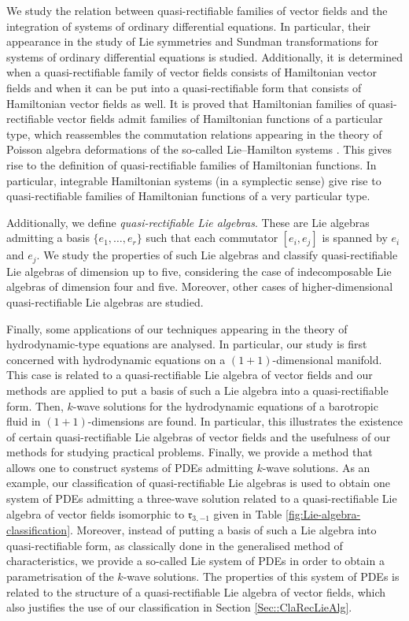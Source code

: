 \documentclass[12pt]{article}
\theoremstyle{plain}
\theoremstyle{definition}
\numberwithin{equation}{section}
\begin{document}
We study the relation between quasi-rectifiable families of vector fields and the integration of systems of ordinary differential equations. In particular, their appearance in the study of Lie symmetries and Sundman transformations for systems of ordinary differential equations  is studied. Additionally, it is determined when a quasi-rectifiable family of vector fields consists of Hamiltonian vector fields and when it can be put into a quasi-rectifiable form that consists of Hamiltonian vector fields as well. It is proved that Hamiltonian families of quasi-rectifiable vector fields admit families of Hamiltonian functions of a particular type, which reassembles the commutation relations appearing in the theory of Poisson algebra deformations of the so-called Lie--Hamilton systems \cite{BCFHL17}. This gives rise to the definition of quasi-rectifiable families of Hamiltonian functions.  In particular, integrable Hamiltonian systems (in a symplectic sense) give rise to quasi-rectifiable families of Hamiltonian functions of a very particular type.

Additionally, we define {\it quasi-rectifiable Lie algebras}. These are Lie algebras admitting a basis $\{e_1,\ldots,e_r\}$ such that each commutator $[e_i,e_j]$ is spanned by $e_i$ and $e_j$. We study the properties of such Lie algebras and classify quasi-rectifiable Lie algebras of dimension up to five, considering the case of indecomposable Lie algebras of dimension four and five. Moreover, other cases of higher-dimensional quasi-rectifiable Lie algebras are studied. 

Finally, some applications of our techniques appearing in the theory of hydrodynamic-type equations are analysed. In particular, our study is first concerned with hydrodynamic equations on a $(1+1)$-dimensional manifold. This case is related to a quasi-rectifiable Lie algebra of vector fields and our methods are applied to put a basis of such a Lie algebra into a quasi-rectifiable form. Then, $k$-wave solutions for the hydrodynamic equations of a barotropic fluid in $(1+1)$-dimensions \cite{Gr23} are found. In particular, this illustrates the existence of certain quasi-rectifiable Lie algebras of vector fields and the usefulness of our methods for studying practical problems. Finally, we provide a method that allows one to construct systems of PDEs admitting $k$-wave solutions. As an example, our classification of quasi-rectifiable Lie algebras is used to obtain one system of PDEs admitting a three-wave solution related to a quasi-rectifiable Lie algebra of vector fields isomorphic to $\mathfrak{r}_{3,-1}$ given in Table \ref{fig:Lie-algebra-classification}.  Moreover, instead of putting a basis of such a Lie algebra into quasi-rectifiable form, as classically done in the generalised method of characteristics, we provide a so-called Lie system of PDEs \cite{CGM07,CL11} in order to obtain a parametrisation of the $k$-wave solutions. The properties of this system of PDEs is related to the structure of a quasi-rectifiable Lie algebra of vector fields, which also justifies the use of our classification in Section \ref{Sec::ClaRecLieAlg}.
\end{document}
